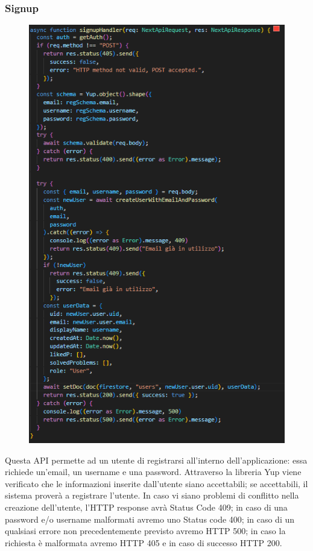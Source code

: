 \documentclass[11pt, a4paper]{article}
\theoremstyle{definition}
\begin{document}
\subsubsection{Signup}
\begin{figure}[H]
  \centering
  \includegraphics[scale = 0.8]{materiale/API/signup.png}
\end{figure}

Questa API permette ad un utente di registrarsi all'interno dell'applicazione: essa richiede un'email, un username e una password.
Attraverso la libreria Yup viene verificato che le informazioni inserite dall'utente siano accettabili; se accettabili, il sistema proverà a registrare l'utente.
In caso vi siano problemi di conflitto nella creazione dell'utente, l'HTTP response avrà Status Code 409; in caso di una password e/o username malformati avremo uno Status code 400;
in caso di un qualsiasi errore non precedentemente previsto avremo HTTP 500; in caso la richiesta è malformata avremo HTTP 405 e in caso di successo HTTP 200.
\end{document}
